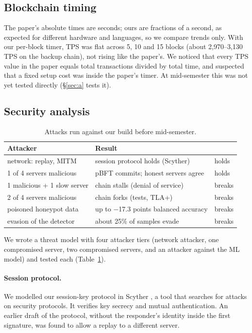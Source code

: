 \documentclass[11pt]{article}
\begin{document}
\subsection{Blockchain timing}
The paper's absolute times are seconds; ours are fractions of a second, as expected for different
hardware and languages, so we compare trends only. With our per-block timer, TPS was flat across
5, 10 and 15 blocks (about 2,970--3,130 TPS on the backup chain), not rising like the paper's. We
noticed that every TPS value in the paper equals total transactions divided by total time, and
suspected that a fixed setup cost was inside the paper's timer. At mid-semester this was not yet
tested directly (\S\ref{sec:a} tests it).

\subsection{Security analysis}

\begin{table}[t]
\centering
\small
\begin{tabular}{@{}p{3.0cm}p{3.35cm}l@{}}
\toprule
\textbf{Attacker} & \textbf{Result} & \\
\midrule
network: replay, MITM & session protocol holds (Scyther) & holds \\
1 of 4 servers malicious & pBFT commits; honest servers agree & holds \\
1 malicious + 1 slow server & chain stalls (denial of service) & breaks \\
2 of 4 servers malicious & chain forks (tests, TLA+) & breaks \\
poisoned honeypot data & up to $-$17.3 points balanced accuracy & breaks \\
evasion of the detector & about 25\% of samples evade & breaks \\
\bottomrule
\end{tabular}
\caption{Attacks run against our build before mid-semester.}
\label{tab:attacks}
\end{table}

We wrote a threat model with four attacker tiers (network attacker, one compromised server, two
compromised servers, and an attacker against the ML model) and tested each
(Table~\ref{tab:attacks}).

\paragraph{Session protocol.} We modelled our session-key protocol in Scyther
\citep{cremers2008scyther}, a tool that searches for attacks on security protocols. It verifies
key secrecy and mutual authentication. An earlier draft of the protocol, without the
responder's identity inside the first signature, was found to allow a replay to a different
server.
\end{document}
